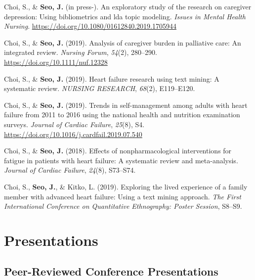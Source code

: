 \documentclass[11pt, a4paper]{awesome-cv}
\begin{document}
\begingroup
\setlength{\parindent}{-0.5in}
\setlength{\leftskip}{0.5in}

\hypertarget{refs_healthcare}{}
\leavevmode\hypertarget{ref-mentalhealth}{}%
Choi, S., \& \textbf{Seo, J.} (in press-). An exploratory study of the research on caregiver depression: Using bibliometrics and lda topic modeling. \emph{Issues in Mental Health Nursing}. \url{https://doi.org/10.1080/01612840.2019.1705944}

\leavevmode\hypertarget{ref-doi:10.1111ux2fnuf.12328}{}%
Choi, S., \& \textbf{Seo, J.} (2019). Analysis of caregiver burden in palliative care: An integrated review. \emph{Nursing Forum}, \emph{54}(2), 280--290. \url{https://doi.org/10.1111/nuf.12328}

\leavevmode\hypertarget{ref-choi2019heart}{}%
Choi, S., \& \textbf{Seo, J.} (2019). Heart failure research using text mining: A systematic review. \emph{NURSING RESEARCH}, \emph{68}(2), E119--E120.

\leavevmode\hypertarget{ref-choi2019trends}{}%
Choi, S., \& \textbf{Seo, J.} (2019). Trends in self-management among adults with heart failure from 2011 to 2016 using the national health and nutrition examination surveys. \emph{Journal of Cardiac Failure}, \emph{25}(8), S4. \url{https://doi.org/10.1016/j.cardfail.2019.07.540}

\leavevmode\hypertarget{ref-choi2018effects}{}%
Choi, S., \& \textbf{Seo, J.} (2018). Effects of nonpharmacological interventions for fatigue in patients with heart failure: A systematic review and meta-analysis. \emph{Journal of Cardiac Failure}, \emph{24}(8), S73--S74.

\leavevmode\hypertarget{ref-choi2019exploring}{}%
Choi, S., \textbf{Seo, J.}, \& Kitko, L. (2019). Exploring the lived experience of a family member with advanced heart failure: Using a text mining approach. \emph{The First International Conference on Quantitative Ethnography: Poster Session}, S8--S9.

\endgroup

\hypertarget{presentations}{%
\section{Presentations}\label{presentations}}

\hypertarget{peer-reviewed-conference-presentations}{%
\subsection{Peer-Reviewed Conference Presentations}\label{peer-reviewed-conference-presentations}}
\end{document}
